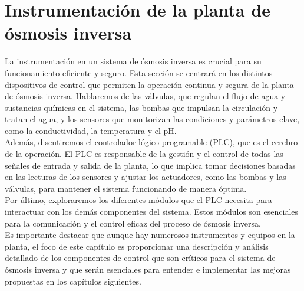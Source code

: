 \section{Instrumentación de la planta de ósmosis inversa}


La instrumentación en un sistema de ósmosis inversa es crucial para su funcionamiento eficiente y seguro. Esta sección se centrará en los distintos dispositivos de control que permiten la operación continua y segura de la planta de ósmosis inversa. Hablaremos de las válvulas, que regulan el flujo de agua y sustancias químicas en el sistema, las bombas que impulsan la circulación y tratan el agua, y los sensores que monitorizan las condiciones y parámetros clave, como la conductividad, la temperatura y el pH.\\

Además, discutiremos el controlador lógico programable (PLC), que es el cerebro de la operación. El PLC es responsable de la gestión y el control de todas las señales de entrada y salida de la planta, lo que implica tomar decisiones basadas en las lecturas de los sensores y ajustar los actuadores, como las bombas y las válvulas, para mantener el sistema funcionando de manera óptima.\\

Por último, exploraremos los diferentes módulos que el PLC necesita para interactuar con los demás componentes del sistema. Estos módulos son esenciales para la comunicación y el control eficaz del proceso de ósmosis inversa.\\

Es importante destacar que aunque hay numerosos instrumentos y equipos en la planta, el foco de este capítulo es proporcionar una descripción y análisis detallado de los componentes de control que son críticos para el sistema de ósmosis inversa y que serán esenciales para entender e implementar las mejoras propuestas en los capítulos siguientes.\\






